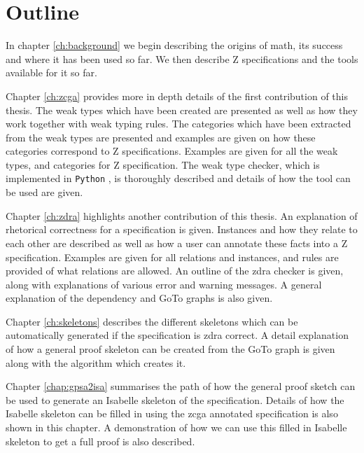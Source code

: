\section{Outline}

In chapter \ref{ch:background} we begin describing the origins of \gls{math},
its success and where it has been used so far. We then describe Z specifications
and the tools available for it so far.


Chapter \ref{ch:zcga} provides more in depth details of the first contribution
of this thesis. The weak types which have been created are presented as well as
how they work together with weak typing rules. The categories which have been
extracted from the weak types are presented and examples are given on how these
categories correspond to Z specifications. Examples are given for all the weak
types, and categories for Z specification. The weak type checker, which is
implemented in \texttt{Python} \cite{Python}, is thoroughly described and
details of how the tool can be used are given.

Chapter \ref{ch:zdra} highlights another contribution of this thesis. An
explanation of rhetorical correctness for a specification is given. Instances
and how they relate to each other are described as well as how a user can
annotate these facts into a Z specification. Examples are given for all
relations and instances, and rules are provided of what relations are allowed.
An outline of the \gls{zdra} checker is given, along with explanations of
various error and warning messages. A general explanation of the dependency and
GoTo graphs is also given.

Chapter \ref{ch:skeletons} describes the different skeletons which can be
automatically generated if the specification is \gls{zdra} correct. A detail
explanation of how a general proof skeleton can be created from the GoTo graph
is given along with the algorithm which creates it. 

Chapter \ref{chap:gpsa2isa} summarises the path of how the general proof sketch
can be used to generate an Isabelle skeleton of the specification. Details of
how the Isabelle skeleton can be filled in using the \gls{zcga} annotated
specification is also shown in this chapter. A demonstration of how we can use
this filled in Isabelle skeleton to get a full proof is also described.

